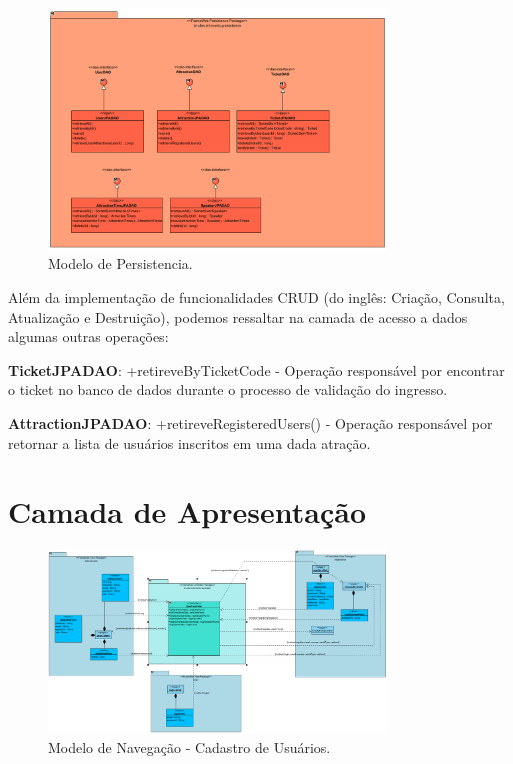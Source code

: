 \begin{figure}[h]
	\centering
	\includegraphics[width=0.8\textwidth]{figuras/ClassesDePersistencia.PNG}
	\caption{Modelo de Persistencia.}
	\label{figura-persistencia}
\end{figure}

Além da implementação de funcionalidades CRUD (do inglês: Criação, Consulta, Atualização e Destruição), podemos ressaltar na camada de acesso a dados algumas outras operações:

\textbf{TicketJPADAO}: +retireveByTicketCode - Operação responsável por encontrar o ticket no banco de dados durante o processo de validação do ingresso.

\textbf{AttractionJPADAO}: +retireveRegisteredUsers() - Operação responsável por retornar a lista de usuários inscritos em uma dada atração.


\section{Camada de Apresentação}
\label{sec-frameweb-apresentacao}

\begin{figure}[h]
	\centering
	\includegraphics[width=0.8\textwidth]{figuras/ModeloNavegacaoUser.PNG}
	\caption{Modelo de Navegação - Cadastro de Usuários.}
	\label{figura-cadastrouser}
\end{figure}

